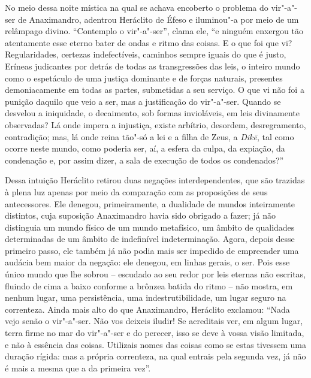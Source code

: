 \sectionitem

No meio dessa noite mística na qual se achava encoberto o problema do \label{noitemistica}
vir"-a"-ser de Anaximandro, adentrou Heráclito de Éfeso e
iluminou"-a por meio de um relâmpago divino. ``Contemplo o vir"-a"-ser'',
clama ele, ``e ninguém enxergou tão atentamente esse eterno bater de
ondas e ritmo das coisas. E o que foi que vi? Regularidades, certezas
indefectíveis, caminhos sempre iguais do que é justo, Eríneas
judicantes por detrás de todas as transgressões das leis, o inteiro
mundo como o espetáculo de uma justiça dominante e de forças naturais,
presentes demoniacamente em todas as partes, submetidas a seu serviço.
O que vi não foi a punição daquilo que veio a ser, mas a
justificação do vir"-a"-ser. Quando se desvelou a iniquidade, o
decaimento, sob formas invioláveis, em leis divinamente observadas? Lá
onde impera a injustiça, existe arbítrio, desordem, desregramento,
contradição; mas, lá onde reina tão"-só a lei e a filha de Zeus, a
\textit{Dik\=e}, tal como ocorre neste mundo, como poderia ser, aí, a
esfera da culpa, da expiação, da condenação e, por assim dizer, a sala
de execução de todos os condenados?''

Dessa intuição Heráclito retirou duas negações interdependentes, que são
trazidas à plena luz apenas por meio da comparação com as proposições
de seus antecessores. Ele denegou, primeiramente, a dualidade de mundos
inteiramente distintos, cuja suposição Anaximandro havia sido obrigado
a fazer; já não distinguia um mundo físico de um mundo metafísico, um
âmbito de qualidades determinadas de um âmbito de indefinível
indeterminação. Agora, depois desse primeiro passo, ele também já não
podia mais ser impedido de empreender uma audácia bem maior da negação:
ele denegou, em linhas gerais, o ser. Pois esse único mundo que lhe \label{esseunicomundo}
sobrou -- escudado ao seu redor por leis eternas não escritas, fluindo
de cima a baixo conforme a brônzea batida do ritmo -- não mostra, em
nenhum lugar, uma persistência, uma indestrutibilidade, um lugar seguro na correnteza. 
Ainda mais alto do que Anaximandro, Heráclito exclamou: ``Nada vejo
senão o vir"-a"-ser. Não vos deixeis iludir! Se acreditais ver, em algum
lugar, terra firme no mar do vir"-a"-ser e do perecer, isso se deve à
vossa visão limitada, e não à essência das coisas. Utilizais nomes das
coisas como se estas tivessem uma duração rígida: mas a própria correnteza, na
qual entrais pela segunda vez, já não é mais a mesma que a da primeira vez''.


